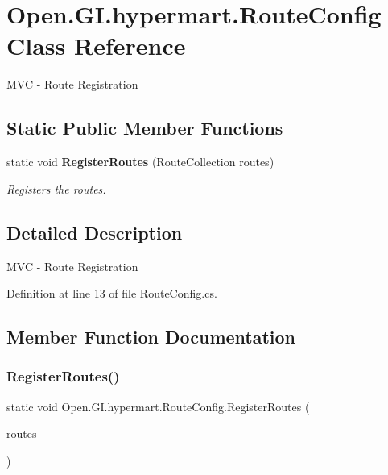 \section{Open.\+G\+I.\+hypermart.\+Route\+Config Class Reference}
\label{class_open_1_1_g_i_1_1hypermart_1_1_route_config}


M\+VC -\/ Route Registration  


\subsection*{Static Public Member Functions}
\begin{DoxyCompactItemize}
\item 
static void \textbf{ Register\+Routes} (Route\+Collection routes)
\begin{DoxyCompactList}\small\item\em Registers the routes. \end{DoxyCompactList}\end{DoxyCompactItemize}


\subsection{Detailed Description}
M\+VC -\/ Route Registration 



Definition at line 13 of file Route\+Config.\+cs.



\subsection{Member Function Documentation}
\mbox{\label{class_open_1_1_g_i_1_1hypermart_1_1_route_config_a9b4bb82c10a972d509a88ad37cb1c783}} 
\subsubsection{Register\+Routes()}
{\footnotesize\ttfamily static void Open.\+G\+I.\+hypermart.\+Route\+Config.\+Register\+Routes (\begin{DoxyParamCaption}\item[{Route\+Collection}]{routes }\end{DoxyParamCaption})\hspace{0.3cm}{\ttfamily [static]}}



